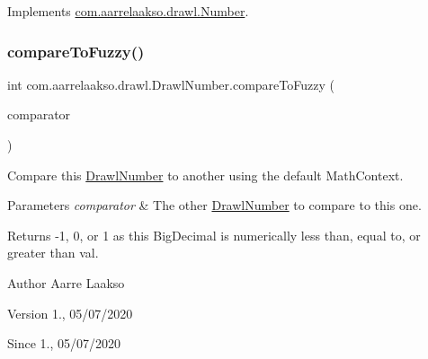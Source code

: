 Implements \hyperlink{interfacecom_1_1aarrelaakso_1_1drawl_1_1_number_a8182808f41dc9573e32884e7155f2776}{com.\+aarrelaakso.\+drawl.\+Number}.

\mbox{\label{classcom_1_1aarrelaakso_1_1drawl_1_1_drawl_number_ab2624aa98592bb5dd20990c7f5921024}} 
\subsubsection{\texorpdfstring{compare\+To\+Fuzzy()}{compareToFuzzy()}\hspace{0.1cm}{\footnotesize\ttfamily [1/2]}}
{\footnotesize\ttfamily int com.\+aarrelaakso.\+drawl.\+Drawl\+Number.\+compare\+To\+Fuzzy (\begin{DoxyParamCaption}\item[{@Not\+Null final \hyperlink{interfacecom_1_1aarrelaakso_1_1drawl_1_1_number}{Number}}]{comparator }\end{DoxyParamCaption})}



Compare this \hyperlink{classcom_1_1aarrelaakso_1_1drawl_1_1_drawl_number}{Drawl\+Number} to another using the default Math\+Context. 


\begin{DoxyParams}{Parameters}
{\em comparator} & The other \hyperlink{classcom_1_1aarrelaakso_1_1drawl_1_1_drawl_number}{Drawl\+Number} to compare to this one. \\
\hline
\end{DoxyParams}
\begin{DoxyReturn}{Returns}
-\/1, 0, or 1 as this Big\+Decimal is numerically less than, equal to, or greater than val. 
\end{DoxyReturn}
\begin{DoxyAuthor}{Author}
Aarre Laakso 
\end{DoxyAuthor}
\begin{DoxyVersion}{Version}
1., 05/07/2020 
\end{DoxyVersion}
\begin{DoxySince}{Since}
1., 05/07/2020 
\end{DoxySince}


